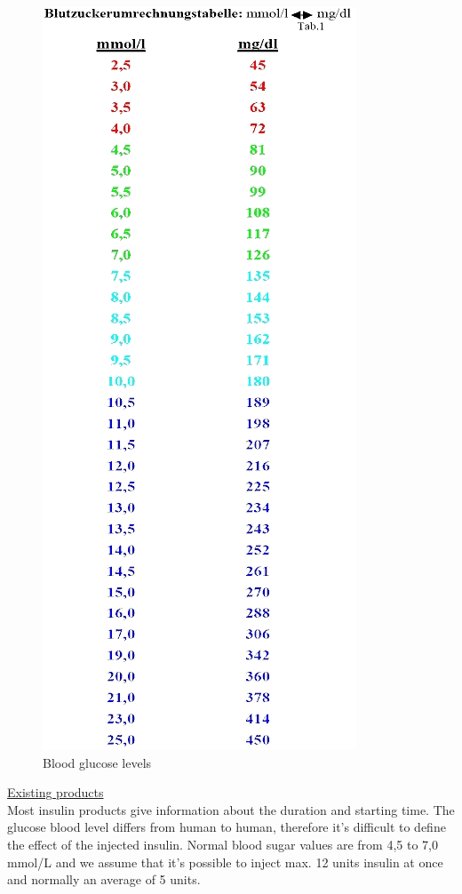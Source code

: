 \begin{figure}[htb]
\centering
\includegraphics[scale=0.6]{images/Conversion.jpg}
\caption{Blood glucose levels}
\end{figure}
\underline{Existing products}\\
Most insulin products give information about the duration and starting time. The glucose blood level differs from 
human to human, therefore it's difficult to define the effect of the injected insulin. 
Normal blood sugar values are from 4,5 to 7,0 mmol/L and we assume that it's possible to inject max. 12 units insulin 
at once and normally an average of 5 units.\\
